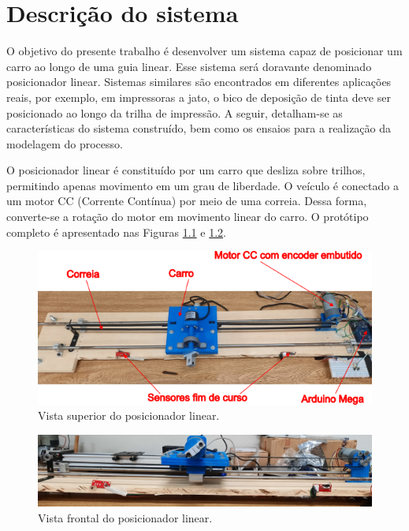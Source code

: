 \chapter{Descrição do sistema}

O objetivo do presente trabalho é desenvolver um sistema capaz de posicionar um carro ao longo de uma guia linear. Esse sistema será doravante denominado posicionador linear. Sistemas similares são encontrados em diferentes aplicações reais, por exemplo, em impressoras a jato, o bico de deposição de tinta deve ser posicionado ao longo da trilha de impressão. A seguir, detalham-se as características do sistema construído, bem como os ensaios para a realização da modelagem do processo.

O posicionador linear é constituído por um carro que desliza sobre trilhos, permitindo apenas movimento em um grau de liberdade. O veículo é conectado a um motor CC (Corrente Contínua) por meio de uma correia. Dessa forma, converte-se a rotação do motor em movimento linear do carro. O protótipo completo é apresentado nas Figuras \ref{fig:vista_superior} e \ref{fig:vista_frontal}.

\begin{figure}[H]
    \centering
    \includegraphics[width=1\linewidth]{figuras/planta_vista_superior.png}
    \caption[Vista superior do posicionador linear]{Vista superior do posicionador linear.}
    \label{fig:vista_superior}
\end{figure}

\begin{figure}[H]
    \centering
    \includegraphics[width=1\linewidth]{figuras/planta_vista_frontal.jpg}
    \caption[Vista frontal do posicionador linear]{Vista frontal do posicionador linear.}
    \label{fig:vista_frontal}
\end{figure}

